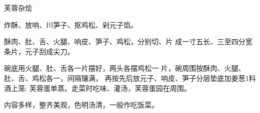 \begin{recipe}{芙蓉杂烩}

\ingredients


\cooking

\step 炸酥、放响、川笋子、抠鸡松、剁元子馅。

\step 酥肉、肚、舌、火腿、响皮、笋子、鸡松，分别切、片 成一寸五长、三至四分宽条片，元子刮成尖刀。

\step 碗底用火腿、肚、舌各一片摆好，两头各摆鸡松一 片，碗周围按酥肉、火腿、肚、舌、鸡松各一，间隔镶满， 再按先后放元子、响皮、笋子分层垫底加姜葱1料酒上笼; 芙蓉蛋单蒸。走菜时吃味、灌汤，芙蓉蛋园在周围。

\notes

内容多样，整齐美观，色明汤清，一般作吃饭菜。

\end{recipe}

